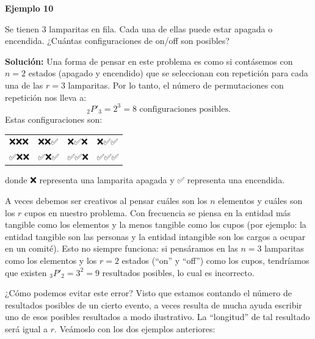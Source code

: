 \documentclass[
  letterpaper,
  DIV=11,
  numbers=noendperiod]{scrreprt}
\begin{document}
\begin{examplebox}

\begin{center}
\textbf{Ejemplo 10}

\end{center}

Se tienen 3 lamparitas en fila. Cada una de ellas puede estar apagada o
encendida. ¿Cuántas configuraciones de on/off son posibles?

\textbf{Solución:} Una forma de pensar en este problema es como si
contásemos con \(n=2\) estados (apagado y encendido) que se seleccionan
con repetición para cada una de las \(r=3\) lamparitas. Por lo tanto, el
número de permutaciones con repetición nos lleva a:
\[_2P'_3 = 2^3 = 8 \text{ configuraciones posibles.}\] Estas
configuraciones son:

\begin{flexcenter}

\begin{half}

\begin{longtable}[]{@{}llll@{}}
\toprule\noalign{}
\endhead
\bottomrule\noalign{}
\endlastfoot
❌❌❌ & ❌❌✅ & ❌✅❌ & ❌✅✅ \\
✅❌❌ & ✅❌✅ & ✅✅❌ & ✅✅✅ \\
\end{longtable}

\end{half}

\end{flexcenter}

donde ❌ representa una lamparita apagada y ✅ representa una encendida.

\end{examplebox}

A veces debemos ser creativos al pensar cuáles son los \(n\) elementos y
cuáles son los \(r\) cupos en nuestro problema. Con frecuencia se piensa
en la entidad más tangible como los elementos y la menos tangible como
los cupos (por ejemplo: la entidad tangible son las personas y la
entidad intangible son los cargos a ocupar en un comité). Esto no
siempre funciona: si pensáramos en las \(n=3\) lamparitas como los
elementos y los \(r=2\) estados (``on'' y ``off'') como los cupos,
tendríamos que existen \(_3P'_2 = 3^2 = 9\) resultados posibles, lo cual
es incorrecto.

¿Cómo podemos evitar este error? Visto que estamos contando el número de
resultados posibles de un cierto evento, a veces resulta de mucha ayuda
escribir uno de esos posibles resultados a modo ilustrativo. La
``longitud'' de tal resultado será igual a \(r\). Veámoslo con los dos
ejemplos anteriores:
\end{document}
